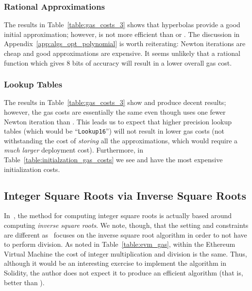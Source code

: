 \subsubsection{Rational Approximations}
\label{app:algs_opt_rational}

The results \HyperFour{} in Table~\ref{table:gas_costs_3}
shows that hyperbolas provide a good initial approximation;
however, \HyperFour{} is not more efficient than \UnrolledThree{}
or \Linear{}.
The discussion in Appendix~\ref{app:algs_opt_polynomial} is worth reiterating:
Newton iterations are cheap and good approximations are expensive.
It seems unlikely that a rational function which gives 8 bits of accuracy
will result in a lower overall gas cost.

\subsubsection{Lookup Tables}
\label{app:algs_opt_lookup}

The results in Table~\ref{table:gas_costs_3}
show \LookupFour{} and \LookupEight{} produce decent results;
however, the gas costs are essentially the same even though \LookupEight{}
uses one fewer Newton iteration than \LookupFour{}.
This leads us to expect that higher precision
lookup tables (which would be ``\texttt{Lookup16}'')
will not result in lower gas costs
(not withstanding the cost of \emph{storing} all the approximations,
which would require a \emph{much larger} deployment cost).
Furthermore, in Table~\ref{table:initialzation_gas_costs}
we see \LookupFour{} and \LookupEight{} have
the most expensive initialization costs.


\subsection{Integer Square Roots via Inverse Square Roots}

In~\cite{FormalVerIsqrt}, the method for computing integer square roots
is actually based around computing \emph{inverse square roots}.
We note, though, that the setting and constraints are different
as~\cite{FormalVerIsqrt} focuses on the inverse square root algorithm
in order to not have to perform division.
As noted in Table~\ref{table:evm_gas},
within the Ethereum Virtual Machine
the cost of integer multiplication and division is the same.
Thus, although it would be an interesting exercise
to implement the algorithm in Solidity,
the author does not expect it to produce an efficient algorithm
(that is, better than \UnrolledThree{}).


